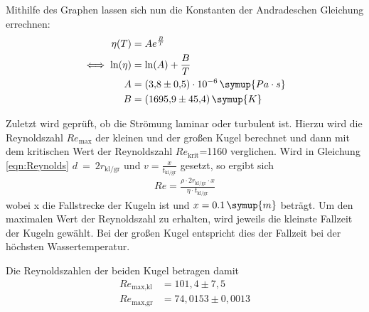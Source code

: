 Mithilfe des Graphen lassen sich nun die Konstanten der 
Andradeschen Gleichung errechnen:
\begin{equation*}
\begin{aligned}
\eta(T) &= Ae^{\frac{B}{T}} \\
\iff \text{ln}(\eta) &= \text{ln}(A) + \frac{B}{T} \\
A &= (3{,}8 \pm 0{,}5)\cdot 10^{-6}\, \symup{Pa \cdot s} \\
B &= (1695{,}9 \pm 45{,}4)\, \symup{K} \\
\end{aligned}
\end{equation*}

Zuletzt wird geprüft, ob die Strömung laminar oder turbulent ist. Hierzu wird die Reynoldszahl $Re_{\text{max}}$ der kleinen und der großen Kugel berechnet und dann mit dem kritischen Wert der 
Reynoldszahl $Re_{\text{krit}}$=1160 verglichen.
Wird in Gleichung \eqref{eqn:Reynolds} $d~=~2r_{\text{kl/gr}}$ und $v=\frac{x}{t_{\text{kl/gr}}}$ gesetzt, so ergibt sich
\begin{equation}
\begin{aligned}
Re = \frac{\rho \cdot 2r_{\text{kl/gr}} \cdot x}{\eta \cdot t_{\text{kl/gr}}}
\end{aligned}
\end{equation}
wobei x die Fallstrecke der Kugeln ist und $x=0.1\,\symup{m}$ \cite[3]{anleitung107} beträgt. Um den maximalen Wert der Reynoldszahl zu erhalten, wird jeweils die kleinste Fallzeit der Kugeln gewählt. Bei der 
großen Kugel entspricht dies der Fallzeit bei der höchsten Wassertemperatur.

Die Reynoldszahlen der beiden Kugel betragen damit
\begin{equation*}
\begin{aligned}
Re_{\text{max,kl}} &= 101{,}4 \pm 7{,}5 \\
Re_{\text{max,gr}} &= 74{,}0153 \pm 0{,}0013
\end{aligned}
\end{equation*}

